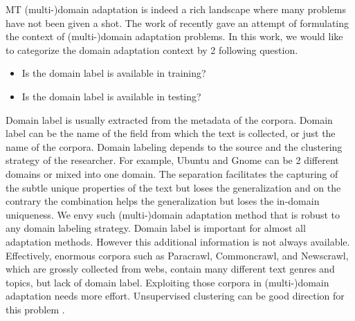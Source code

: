 MT (multi-)domain adaptation is indeed a rich landscape where many problems have not been given a shot. The work of \citet{Pham21revisiting} recently gave an attempt of formulating the context of (multi-)domain adaptation problems. In this work, we would like to categorize the domain adaptation context by 2 following question.
\begin{itemize}
	\item Is the domain label is available in training?
	\item Is the domain label is available in testing?
\end{itemize}

Domain label is usually extracted from the metadata of the corpora. Domain label can be the name of the field from which the text is collected, or just the name of the corpora. Domain labeling depends to the source and the clustering strategy of the researcher. For example, Ubuntu and Gnome can be 2 different domains or mixed into one domain. The separation facilitates the capturing of the subtle unique properties of the text but loses the generalization and on the contrary the combination helps the generalization but loses the in-domain uniqueness. We envy such (multi-)domain adaptation method that is robust to any domain labeling strategy. Domain label is important for almost all adaptation methods. However this additional information is not always available. Effectively, enormous corpora such as Paracrawl, Commoncrawl, and Newscrawl, which are grossly collected from webs, contain many different text genres and topics, but lack of domain label. Exploiting those corpora in (multi-)domain adaptation needs more effort. Unsupervised clustering can be good direction for this problem \citep{Aharoni20unsupervised,Pham21revisiting}. 




































